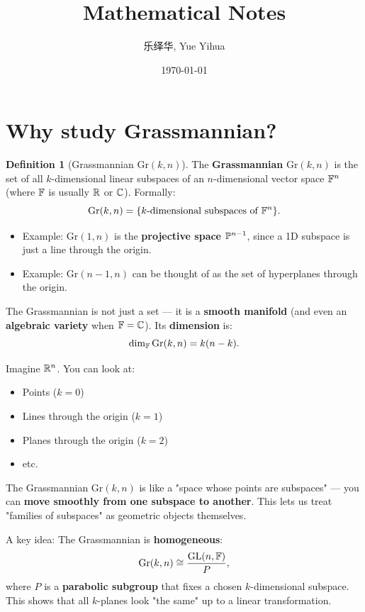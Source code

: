 \documentclass{amsart}
\author{乐绎华, Yue Yihua}
\date{\today}
\title{Mathematical Notes}
\let\originalmathbb\mathbb
\renewcommand{\mathbb}[1]{%
    \ifstrequal{#1}{1}{\mathbbm{#1}}{\originalmathbb{#1}}%
}
\theoremstyle{plain}
\theoremstyle{definition}
\newtheorem{definition}[theorem]{Definition}
\theoremstyle{remark}
\begin{document}
\maketitle
\tableofcontents

\section{Why study Grassmannian?}

\begin{definition}[Grassmannian $\mathrm{Gr}(k, n)$]
The \textbf{Grassmannian} $\mathrm{Gr}(k, n)$ is the set of all $k$-dimensional linear subspaces of an $n$-dimensional vector space $\mathbb{F}^n$ (where $\mathbb{F}$ is usually $\mathbb{R}$ or $\mathbb{C}$).
Formally:
\[
\mathrm{Gr}(k, n) = \{ \text{\(k\)-dimensional subspaces of } \mathbb{F}^n \}.
\]	\begin{itemize}
		\item Example: $\mathrm{Gr}(1, n)$ is the \textbf{projective space} $\mathbb{P}^{n-1}$, since a 1D subspace is just a line through the origin.
		\item Example: $\mathrm{Gr}(n-1, n)$ can be thought of as the set of hyperplanes through the origin.
	\end{itemize}
The Grassmannian is not just a set — it is a \textbf{smooth manifold} (and even an \textbf{algebraic variety} when $\mathbb{F} = \mathbb{C}$).
Its \textbf{dimension} is:
\[
\dim_{\mathbb{F}} \mathrm{Gr}(k, n) = k(n-k).
\]
\end{definition}
Imagine $\mathbb{R}^n$. You can look at:

\begin{itemize}
	\item Points ($k=0$)
	\item Lines through the origin ($k=1$)
	\item Planes through the origin ($k=2$)
	\item etc.
\end{itemize}

The Grassmannian $\mathrm{Gr}(k, n)$ is like a "space whose points are subspaces" — you can \textbf{move smoothly from one subspace to another}. This lets us treat "families of subspaces" as geometric objects themselves.

A key idea:
The Grassmannian is \textbf{homogeneous}:
\[
\mathrm{Gr}(k, n) \cong \frac{\mathrm{GL}(n, \mathbb{F})}{P},
\]
where $P$ is a \textbf{parabolic subgroup} that fixes a chosen $k$-dimensional subspace. This shows that all $k$-planes look "the same" up to a linear transformation.
\end{document}
